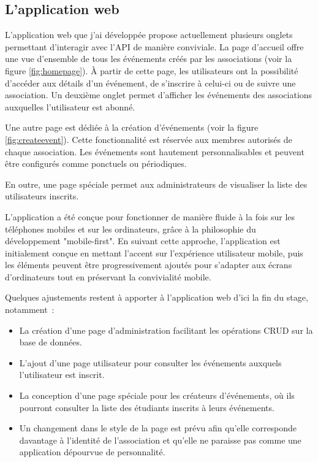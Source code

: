 \subsection{L'application web}

L'application web que j'ai développée propose actuellement plusieurs onglets permettant d'interagir avec l'API de manière conviviale. La page d'accueil offre une vue d'ensemble de tous les événements créés par les associations (voir la figure \ref{fig:homepage}). À partir de cette page, les utilisateurs ont la possibilité d'accéder aux détails d'un événement, de s'inscrire à celui-ci ou de suivre une association. Un deuxième onglet permet d'afficher les événements des associations auxquelles l'utilisateur est abonné.


Une autre page est dédiée à la création d'événements (voir la figure \ref{fig:createevent}). Cette fonctionnalité est réservée aux membres autorisés de chaque association. Les événements sont hautement personnalisables et peuvent être configurés comme ponctuels ou périodiques.


En outre, une page spéciale permet aux administrateurs de visualiser la liste des utilisateurs inscrits.

\medskip

L'application a été conçue pour fonctionner de manière fluide à la fois sur les téléphones mobiles et sur les ordinateurs, grâce à la philosophie du développement "mobile-first". En suivant cette approche, l'application est initialement conçue en mettant l'accent sur l'expérience utilisateur mobile, puis les éléments peuvent être progressivement ajoutés pour s'adapter aux écrans d'ordinateurs tout en préservant la convivialité mobile.

\medskip

Quelques ajustements restent à apporter à l'application web d'ici la fin du stage, notamment~:

\begin{itemize}
	\item  La création d'une page d'administration facilitant les opérations CRUD sur la base de données.
	
	\item L'ajout d'une page utilisateur pour consulter les événements auxquels l'utilisateur est inscrit.
	
	\item La conception d'une page spéciale pour les créateurs d'événements, où ils pourront consulter la liste des étudiants inscrits à leurs événements.
	
	\item Un changement dans le style de la page est prévu afin qu'elle corresponde davantage à l'identité de l'association et qu'elle ne paraisse pas comme une application dépourvue de personnalité.
\end{itemize}

